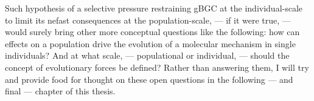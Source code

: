 Such hypothesis of a selective pressure restraining gBGC at the individual-scale to limit its nefast consequences at the population-scale, — if it were true, — would surely bring other more conceptual questions like the following:
how can effects on a population drive the evolution of a molecular mechanism in single individuals?
And at what scale, — populational or individual, — should the concept of evolutionary forces be defined?
Rather than answering them, I will try and provide food for thought on these open questions in the following — and final — chapter of this thesis.









